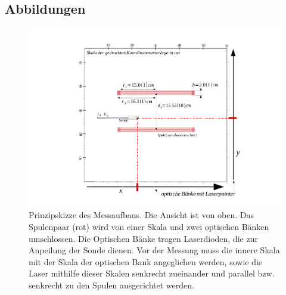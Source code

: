 \documentclass[12pt,a4paper]{article}
\begin{document}
\subsection{Abbildungen}
\label{ch:abb}
\begin{figure}[H]
\centering
\includegraphics[scale=0.85]{Aufbauskizze1.pdf}
\caption{Prinzipskizze des Messaufbaus. Die Ansicht ist von oben. Das Spulenpaar (rot) wird von einer Skala und zwei optischen Bänken umschlossen. Die Optischen Bänke tragen Laserdioden, die zur Anpeilung der Sonde dienen. Vor der Messung muss die innere Skala mit der Skala der optischen Bank angeglichen werden, sowie die Laser mithilfe dieser Skalen senkrecht zueinander und parallel bzw. senkrecht zu den Spulen ausgerichtet werden.}
\label{fig:sk1}
\end{figure}
\newpage
\end{document}
